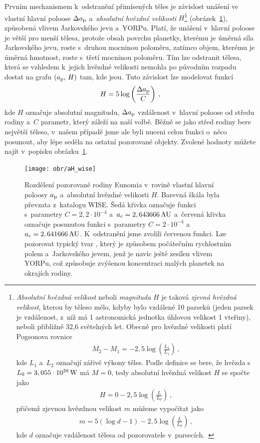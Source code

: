 \documentclass[A4paper, 12pt, oneside]{book}
\begin{document}
Prvním mechanismem k~odstranění přimísených těles je závislost unášení ve vlastní hlavní poloose $\Delta a_{\rm p}$ a~\textit{absolutní hvězdné velikosti} $H$\footnote{\textit{Absolutní hvězdná velikost} neboli \textit{magnituda} $H$ je taková \textit{zjevná hvězdná velikost}, kterou by těleso mělo, kdyby bylo vzdálené 10 parseků (jeden parsek je vzdálenost, z~níž má 1 astronomická jednotka úhlovou velikost 1 vteřiny), neboli přibližně 32,6 světelných let. Obecně pro hvězdné velikosti platí Pogsonova rovnice
\begin{align*}
	M_2-M_1=-2,5\log\left(\frac{L_2}{L_1}\right)\,,
\end{align*}
kde $L_1$ a~$L_2$ označují zářivé výkony těles. Podle definice se bere, že hvězda s~$L_0=3,055\cdot10^{28}\,{\rm W}$ má $M=0$, tedy absolutní hvězdná velikost $H$ se spočte jako
\begin{align*}
	H=0-2,5\log\left(\frac{L}{L_0}\right)\,,
\end{align*}
přičemž zjevnou hvězdnou velikost $m$ můžeme vypočítat jako
\begin{align*}
	m=5(\log d -1)-2,5\log\left(\frac{L}{L_0}\right)\,,
\end{align*}
kde $d$ označuje vzdálenost tělesa od pozorovatele v~parsecích.~\cite{fmt}} 
(obrázek~\ref{fig:aH_wise}), způsobená vlivem Jarkovského jevu a~YORPu. Platí, že unášení v~hlavní poloose je větší pro menší tělesa, protože obsah povrchu planetky, kterému je úměrná síla Jarkovského jevu, roste s~druhou mocninou poloměru, zatímco objem, kterému je úměrná hmotnost, roste s~třetí mocninou poloměru. Tím lze odstranit tělesa, která se vzhledem k~jejich hvězdné velikosti nemohla po původním rozpadu dostat na grafu $(a_{\rm p},\,H)$ tam, kde jsou. Tuto závislost lze modelovat funkcí 
\begin{align}
	H=5\log\left(\frac{\Delta a_{\rm p}}{C}\right)\,,
\end{align}
kde $H$ označuje absolutní magnitudu, $\Delta a_{\rm p}$ vzdálenost v~hlavní poloose od středu rodiny a~$C$ parametr, který záleží na naší volbě. Běžně se jako střed rodiny bere největší těleso, v~našem případě jsme ale byli nuceni celou funkci o~něco posunout, aby lépe seděla na ostatní pozorované objekty. Zvolené hodnoty můžete najít v~popisku obrázku~\ref{fig:aH_wise}.
\begin{figure}
	\centering
	\texttt{[image: obr/aH\_wise]}
	\caption{Rozdělení pozorované rodiny Eunomia v~rovině vlastní hlavní poloosy $a_{\rm p}$ a~absolutní hvězdné velikosti $H$. Barevná škála byla převzata z~katalogu WISE. Šedá křivka označuje funkci s~parametry ${C=2,2\cdot10^{-4}}$ a~${a_c=2,643666\,{\rm AU}}$ a~červená křivka označuje posunutou funkci s~parametry ${C=2\cdot10^{-4}}$ a~${a_c=2,641666\,{\rm AU}}$. K~odstranění  jsme zvolili červenou funkci. Lze pozorovat typický tvar , který je způsobem počátečním rychlostním polem a~Jarkovského jevem, jenž je navíc ještě zesílen vlivem YORPu, což způsobuje zvýšenou koncentraci malých planetek na okrajích rodiny.}
	\label{fig:aH_wise}
\end{figure}
\end{document}
